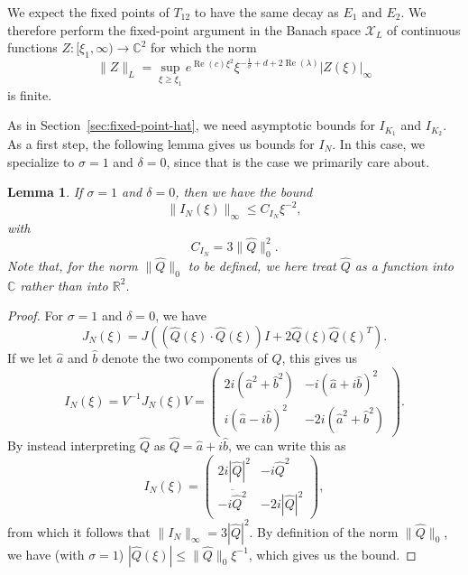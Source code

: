 \documentclass[11pt]{article}
\DeclareMathOperator{\real}{Re}
\newcommand{\conj}[1]{\overline{#1}}
\newcommand{\Space}{\mathcal{X}}
\newtheorem{lemma}[definition]{Lemma}
\begin{document}
We expect the fixed points of \(T_{12}\) to have the same decay as
\(E_{1}\) and \(E_{2}\). We therefore perform the fixed-point argument
in the Banach space \(\Space_{L}\) of continuous functions
\(Z \colon [\xi_{1}, \infty) \to \mathbb{C}^{2}\) for which the norm
\begin{equation*}
  \|Z\|_{L} = \sup_{\xi \geq \xi_{1}} e^{\real(c)\xi^{2}}\xi^{-\frac{1}{\sigma} + d + 2\real(\lambda)}|Z(\xi)|_{\infty}
\end{equation*}
is finite.

As in Section~\ref{sec:fixed-point-hat}, we need asymptotic bounds for
\(I_{K_{1}}\) and \(I_{K_{2}}\). As a first step, the following lemma
gives us bounds for \(I_{N}\). In this case, we specialize to
\(\sigma = 1\) and \(\delta = 0\), since that is the case we primarily
care about.

\begin{lemma}\label{lemma:bound-I_N}
  If \(\sigma = 1\) and \(\delta = 0\), then we have the bound
  \begin{equation*}
    \|I_{N}(\xi)\|_{\infty} \leq C_{I_{N}}\xi^{-2},
  \end{equation*}
  with
  \begin{equation*}
    C_{I_{N}} = 3\|\hat{Q}\|_{0}^{2}.
  \end{equation*}
  Note that, for the norm \(\|\hat{Q}\|_{0}\) to be defined, we here
  treat \(\hat{Q}\) as a function into \(\mathbb{C}\) rather than into
  \(\mathbb{R}^{2}\).
\end{lemma}

\begin{proof}
  For \(\sigma = 1\) and \(\delta = 0\), we have
  \begin{equation*}
    J_{N}(\xi) = J((\hat{Q}(\xi) \cdot \hat{Q}(\xi))I + 2\hat{Q}(\xi)\hat{Q}(\xi)^{T}).
  \end{equation*}
  If we let \(\hat{a}\) and \(\hat{b}\) denote the two components of
  \(\hat{Q}\), this gives us
  \begin{equation*}
    I_{N}(\xi) = V^{-1}J_{N}(\xi)V =
    \begin{pmatrix}
      2i(\hat{a}^{2} + \hat{b}^{2}) & -i(\hat{a} + i\hat{b})^{2}\\
      i(\hat{a} - i\hat{b})^{2} & -2i(\hat{a}^{2} + \hat{b}^{2})
    \end{pmatrix}.
  \end{equation*}
  By instead interpreting \(\hat{Q}\) as
  \(\hat{Q} = \hat{a} + i\hat{b}\), we can write this as
  \begin{equation*}
    I_{N}(\xi) =
    \begin{pmatrix}
      2i|\hat{Q}|^{2} & -i\hat{Q}^{2}\\
      \conj{-i\hat{Q}^{2}} & -2i|\hat{Q}|^{2}
    \end{pmatrix},
  \end{equation*}
  from which it follows that \(\|I_{N}\|_{\infty} = 3|\hat{Q}|^{2}\).
  By definition of the norm \(\|\hat{Q}\|_{0}\), we have (with
  \(\sigma = 1\)) \(|\hat{Q}(\xi)| \leq \|\hat{Q}\|_{0}\xi^{-1}\),
  which gives us the bound.
\end{proof}
\end{document}
